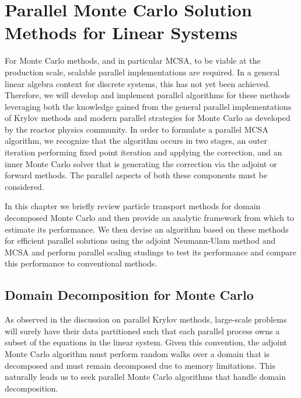 \chapter{Parallel Monte Carlo Solution Methods for Linear Systems}
\label{ch:parallel_methods}
For Monte Carlo methods, and in particular MCSA, to be viable at the
production scale, scalable parallel implementations are required. In a
general linear algebra context for discrete systems, this has not yet
been achieved. Therefore, we will develop and implement parallel
algorithms for these methods leveraging both the knowledge gained from
the general parallel implementations of Krylov methods and modern
parallel strategies for Monte Carlo as developed by the reactor
physics community. In order to formulate a parallel MCSA algorithm, we
recognize that the algorithm occurs in two stages, an outer iteration
performing fixed point iteration and applying the correction, and an
inner Monte Carlo solver that is generating the correction via the
adjoint or forward methods. The parallel aspects of both these
components must be considered.

In this chapter we briefly review particle transport methods for
domain decomposed Monte Carlo and then provide an analytic framework
from which to estimate its performance. We then devise an algorithm
based on these methods for efficient parallel solutions using the
adjoint Neumann-Ulam method and MCSA and perform parallel scaling
studings to test its performance and compare this performance to
conventional methods.

\section{Domain Decomposition for Monte Carlo}
\label{sec:msod}
As observed in the discussion on parallel Krylov methods, large-scale
problems will surely have their data partitioned such that each
parallel process owns a subset of the equations in the linear
system. Given this convention, the adjoint Monte Carlo algorithm must
perform random walks over a domain that is decomposed and must remain
decomposed due to memory limitations. This naturally leads us to seek
parallel Monte Carlo algorithms that handle domain decomposition.

